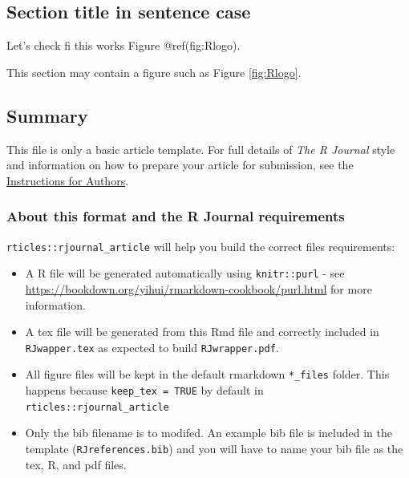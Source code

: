 \hypertarget{section-title-in-sentence-case}{%
\subsection{Section title in sentence
case}\label{section-title-in-sentence-case}}

Let's check fi this works Figure @ref(fig:Rlogo).

This section may contain a figure such as Figure \ref{fig:Rlogo}.

\hypertarget{summary}{%
\subsection{Summary}\label{summary}}

This file is only a basic article template. For full details of
\emph{The R Journal} style and information on how to prepare your
article for submission, see the
\href{https://journal.r-project.org/share/author-guide.pdf}{Instructions
for Authors}.

\hypertarget{about-this-format-and-the-r-journal-requirements}{%
\subsubsection{About this format and the R Journal
requirements}\label{about-this-format-and-the-r-journal-requirements}}

\texttt{rticles::rjournal\_article} will help you build the correct
files requirements:

\begin{itemize}
\tightlist
\item
  A R file will be generated automatically using \texttt{knitr::purl} -
  see \url{https://bookdown.org/yihui/rmarkdown-cookbook/purl.html} for
  more information.
\item
  A tex file will be generated from this Rmd file and correctly included
  in \texttt{RJwapper.tex} as expected to build \texttt{RJwrapper.pdf}.
\item
  All figure files will be kept in the default rmarkdown
  \texttt{*\_files} folder. This happens because
  \texttt{keep\_tex\ =\ TRUE} by default in
  \texttt{rticles::rjournal\_article}
\item
  Only the bib filename is to modifed. An example bib file is included
  in the template (\texttt{RJreferences.bib}) and you will have to name
  your bib file as the tex, R, and pdf files.
\end{itemize}



\address{%
Emi Tanaka\\
Monash University\\%
Monash University\\ Clayton campus, VIC 3800, Australia\\
%
\url{http://emitanaka.org/}%
\\\textit{ORCiD: \href{https://orcid.org/0000-0002-1455-259X}{0000-0002-1455-259X}}%
\\\href{mailto:emi.tanaka@monash.edu}{\nolinkurl{emi.tanaka@monash.edu}}
}
